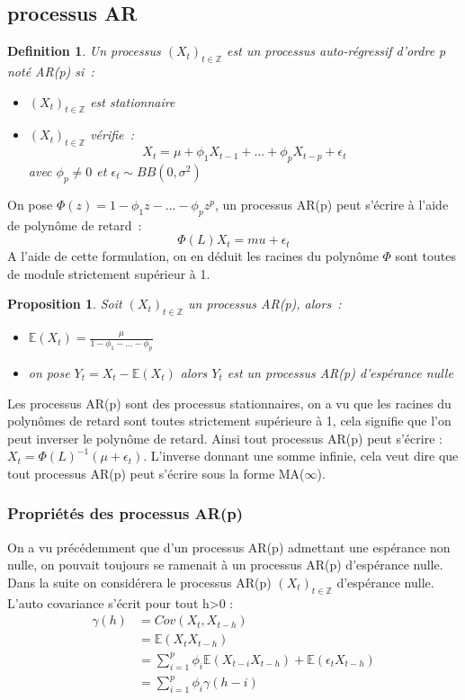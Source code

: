 \documentclass[11pt]{scrartcl} %
\newtheorem{Def}[theorem]{Definition}
\newtheorem{pro}[theorem]{Proposition}
\newcommand{\Xt}{\left(X_t\right)_{t\in\mathbb{Z}}}
\begin{document}
\subsection{processus AR}
\begin{Def}
Un processus $\Xt$ est un processus auto-régressif d'ordre p noté AR(p) si~:
\begin{itemize}
\item[i)] $\Xt$ est stationnaire
\item[ii)] $\Xt$ vérifie~:
$$
X_t = \mu + \phi_1X_{t-1}+...+\phi_pX_{t-p}+\epsilon_t
$$
avec $\phi_p\not=0$ et $\epsilon_t\sim BB(0,\sigma^2)$
\end{itemize}
\end{Def}
On pose $\Phi(z)=1-\phi_1z-...-\phi_pz^p$, un processus AR(p) peut s'écrire à l'aide de polynôme de retard~:
$$
\Phi(L)X_t = mu + \epsilon_t
$$
A l'aide de cette formulation, on en déduit les racines du polynôme $\Phi$ sont toutes de module strictement supérieur à 1.
\begin{pro}
Soit $\Xt$ un processus AR(p), alors~:
\begin{itemize}
\item $\mathbb{E}\left(X_t\right) = \frac{\mu}{1-\phi_1-...-\phi_p}$\\
\item on pose $Y_t=X_t-\mathbb{E}\left(X_t\right)$ alors $Y_t$ est un processus AR(p) d'espérance nulle
\end{itemize}
\end{pro}
Les processus AR(p) sont des processus stationnaires, on a vu que les racines du polynômes de retard sont toutes strictement supérieure à 1, cela signifie que l'on peut inverser le polynôme de retard. Ainsi tout processus AR(p) peut s'écrire : $X_t = \Phi(L)^{-1}\left(\mu + \epsilon_t\right)$. L'inverse donnant une somme infinie, cela veut dire que tout processus AR(p) peut s'écrire sous la forme MA($\infty$).

\subsubsection{Propriétés des processus AR(p)}
On a vu précédemment que d'un processus AR(p) admettant une espérance non nulle, on pouvait toujours se ramenait à un processus AR(p) d'espérance nulle. Dans la suite on considérera le processus AR(p) $\Xt$ d'espérance nulle. L'auto covariance s'écrit pour tout h>0 : 
\begin{align*}
\gamma(h)&= Cov(X_t,X_{t-h})\\
&= \mathbb{E}\left(X_tX_{t-h}\right)\\
&= \sum_{i=1}^p\phi_i\mathbb{E}\left(X_{t-i}X_{t-h}\right)+\mathbb{E}\left(\epsilon_tX_{t-h}\right)\\
&= \sum_{i=1}^p\phi_i\gamma(h-i)
\end{align*}
\end{document}
